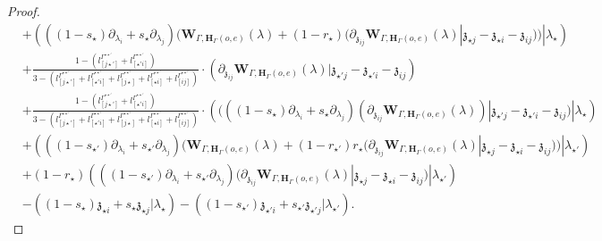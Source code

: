 \documentclass[11pt]{amsart}
\theoremstyle{definition}
\theoremstyle{remark}
\numberwithin{equation}{section}
\begin{document}
\begin{proof}
\begin{align*}
&+\left(((1-s_{\star})\partial_{\lambda_i}+s_{\star}\partial_{\lambda_j})(\mathbf{W}_{\Gamma,\mathbf{H}_{\Gamma}(o,e)}(\lambda)+(1-r_{\star})(\partial_{\mathfrak{z}_{ij}}\mathbf{W}_{\Gamma,\mathbf{H}_{\Gamma}(o,e)}(\lambda)|\mathfrak{z}_{\star j}-\mathfrak{z}_{\star i}-\mathfrak{z}_{ij}))|\lambda_{\star}\right)\\
&+\frac{1-(l^{\Gamma^{\star\star'}}_{[ j\star']}+l^{\Gamma^{\star\star'}}_{[ \star 'i]})}{3-(l^{\Gamma^{\star\star'}}_{[ j\star']}+l^{\Gamma^{\star\star'}}_{[ \star 'i]}+l^{\Gamma^{\star\star'}}_{[ j\star]}+l^{\Gamma^{\star\star'}}_{[ \star i]}+l^{\Gamma^{\star\star'}}_{[ ij]})}\cdot\left(\partial_{\mathfrak{z}_{ij}}\mathbf{W}_{\Gamma,\mathbf{H}_{\Gamma}(o,e)}(\lambda)|\mathfrak{z}_{\star' j}-\mathfrak{z}_{\star' i}-\mathfrak{z}_{ij}\right)\\
&+\frac{1-(l^{\Gamma^{\star\star'}}_{[ j\star']}+l^{\Gamma^{\star\star'}}_{[ \star 'i]})}{3-(l^{\Gamma^{\star\star'}}_{[ j\star']}+l^{\Gamma^{\star\star'}}_{[ \star 'i]}+l^{\Gamma^{\star\star'}}_{[ j\star]}+l^{\Gamma^{\star\star'}}_{[ \star i]}+l^{\Gamma^{\star\star'}}_{[ ij]})}\cdot \left((((1-s_{\star})\partial_{\lambda_i}+s_{\star}\partial_{\lambda_j})(\partial_{\mathfrak{z}_{ij}}\mathbf{W}_{\Gamma,\mathbf{H}_{\Gamma}(o,e)}(\lambda))|\mathfrak{z}_{\star' j}-\mathfrak{z}_{\star' i}-\mathfrak{z}_{ij})|\lambda_{\star}\right)\\
 &  +\left(((1-s_{\star'})\partial_{\lambda_i}+s_{\star'}\partial_{\lambda_j})(\mathbf{W}_{\Gamma,\mathbf{H}_{\Gamma}(o,e)}(\lambda)+(1-r_{\star'})r_{\star}(\partial_{\mathfrak{z}_{ij}}\mathbf{W}_{\Gamma,\mathbf{H}_{\Gamma}(o,e)}(\lambda)|\mathfrak{z}_{\star j}-\mathfrak{z}_{\star i}-\mathfrak{z}_{ij}))|\lambda_{\star'}\right)\\
   &+(1-r_{\star})\left(((1-s_{\star'})\partial_{\lambda_i}+s_{\star'}\partial_{\lambda_j})(\partial_{\mathfrak{z}_{ij}}\mathbf{W}_{\Gamma,\mathbf{H}_{\Gamma}(o,e)}(\lambda)|\mathfrak{z}_{\star j}-\mathfrak{z}_{\star i}-\mathfrak{z}_{ij})|\lambda_{\star'}\right)\\
   &-\left((1-s_{\star})\mathfrak{z}_{\star i}+s_{\star}\mathfrak{z}_{\star j}|\lambda_{\star}\right)-\left((1-s_{\star'})\mathfrak{z}_{\star' i}+s_{\star'}\mathfrak{z}_{\star' j}|\lambda_{\star'}\right).
\end{align*}



\end{proof}
\end{document}
